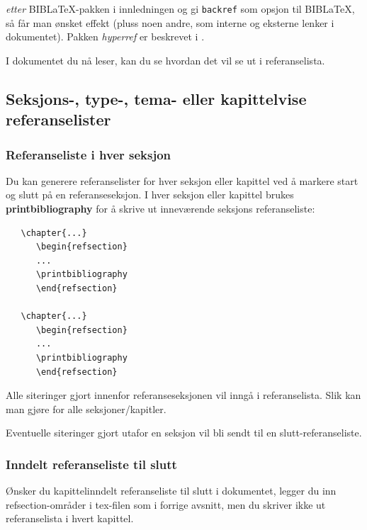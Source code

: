 \documentclass[11pt,norsk,a4paper]{article}
\newcommand{\kdo}[1]{\texttt{#1}}
\newcommand{\blt}{B{\smaller[2]IB}\discretionary{-}{}{\kern
    -0.12em}\LaTeX{}}
\begin{document}
\noindent\textit{etter} \blt-pakken
i innledningen og gi \kdo{backref} som opsjon til \blt{}, så får man ønsket effekt (pluss noen andre, som
interne og eksterne lenker i dokumentet). Pakken \textit{hyperref} er
beskrevet i \cite{hyperref}.

I dokumentet du nå leser, kan du se hvordan det vil se ut i referanselista.

\subsection{Seksjons-, type-, tema- eller kapittelvise referanselister}
\subsubsection*{Referanseliste i hver seksjon}
Du kan generere referanselister for hver seksjon eller kapittel ved å
markere start og slutt på en referanseseksjon. I hver seksjon eller
kapittel brukes \textbf{printbibliography} for å skrive ut inneværende
seksjons referanseliste:

{\footnotesize\begin{verbatim}
   \chapter{...}
      \begin{refsection}
      ...
      \printbibliography
      \end{refsection}

   \chapter{...}
      \begin{refsection}
      ...
      \printbibliography
      \end{refsection}
\end{verbatim}}

Alle siteringer gjort innenfor referanseseksjonen vil inngå i
referanselista. Slik kan man gjøre for alle seksjoner/kapitler.

Eventuelle siteringer gjort utafor en seksjon vil
bli sendt til en slutt-referanse\-liste.

\subsubsection*{Inndelt referanseliste til slutt}

Ønsker du kapittelinndelt referanseliste til slutt i dokumentet,
legger du inn refsection-områder i tex-filen som i forrige avsnitt,
men du skriver ikke ut referanselista i hvert kapittel.
\end{document}
